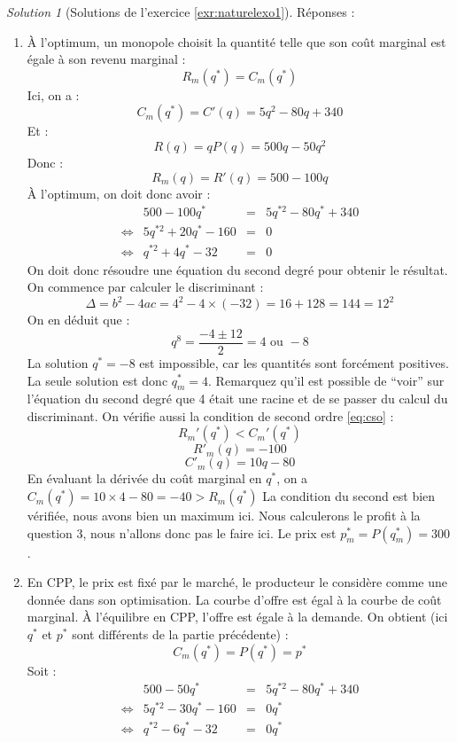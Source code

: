 \documentclass[
]{book}
\theoremstyle{definition}
\theoremstyle{definition}
\theoremstyle{definition}
\theoremstyle{definition}
\theoremstyle{remark}
\newtheorem*{solution}{Solution}
\begin{document}
\begin{solution}[Solutions de l'exercice \ref{exr:naturelexo1}]

Réponses :

\begin{enumerate}
\def\labelenumi{\arabic{enumi}.}
\item
  À l'optimum, un monopole choisit la quantité telle que son coût marginal est égale à son revenu marginal :
  \[R_m(q^*)=C_m(q^*)\]
  Ici, on a :
  \[C_m(q^*)=C'(q)=5q^2-80q+340\]
  Et :
  \[R(q) =qP(q)=500q-50q^2\]
  Donc :
  \[R_m(q)=R'(q)=500-100q\]
  À l'optimum, on doit donc avoir :
  \[
  \begin{array}{crcl}
  &500-100q^*&=&5q^{*2}-80q^*+340\\
  \Leftrightarrow & 5q^{*2}+20q^*-160&=&0\\
  \Leftrightarrow & q^{*2}+4q^*-32&=&0
  \end{array}
  \]
  On doit donc résoudre une équation du second degré pour obtenir le résultat.
  On commence par calculer le discriminant :
  \[\Delta=b^2-4ac=4^2-4\times(-32)=16+128=144=12^2\]
  On en déduit que :
  \[q^8=\frac{-4\pm12}{2}=4\text{ ou } -8\]
  La solution \(q^*=-8\) est impossible, car les quantités sont forcément positives.
  La seule solution est donc \(q^*_m=4\).
  Remarquez qu'il est possible de ``voir'' sur l'équation du second degré que 4 était une racine et de se passer du calcul du discriminant.
  On vérifie aussi la condition de second ordre \eqref{eq:cso} :
  \[R_m'(q^*)<C_m'(q^*)\]
  \[R'_m(q)=-100\]
  \[C'_m(q)=10q-80\]
  En évaluant la dérivée du coût marginal en \(q^*\), on a \(C_m(q^*)=10\times4-80=-40>R_m(q^*)\)
  La condition du second est bien vérifiée, nous avons bien un maximum ici.
  Nous calculerons le profit à la question 3, nous n'allons donc pas le faire ici.
  Le prix est \(p^*_m=P(q^*_m)=300\).
\item
  En CPP, le prix est fixé par le marché, le producteur le considère comme une donnée dans son optimisation.
  La courbe d'offre est égal à la courbe de coût marginal.
  À l'équilibre en CPP, l'offre est égale à la demande.
  On obtient (ici \(q^*\) et \(p^*\) sont différents de la partie précédente) :
  \[C_m(q^*)=P(q^*)=p^*\]
  Soit :
  \[
  \begin{array}{crcl}
  &500-50q^*&=&5q^{*2}-80q^*+340\\
  \Leftrightarrow & 5q^{*2}-30q^*-160&=&0q^*\\
  \Leftrightarrow & q^{*2}-6q^*-32&=&0q^*
  \end{array}
  \]

\end{enumerate}
\end{solution}
\end{document}
